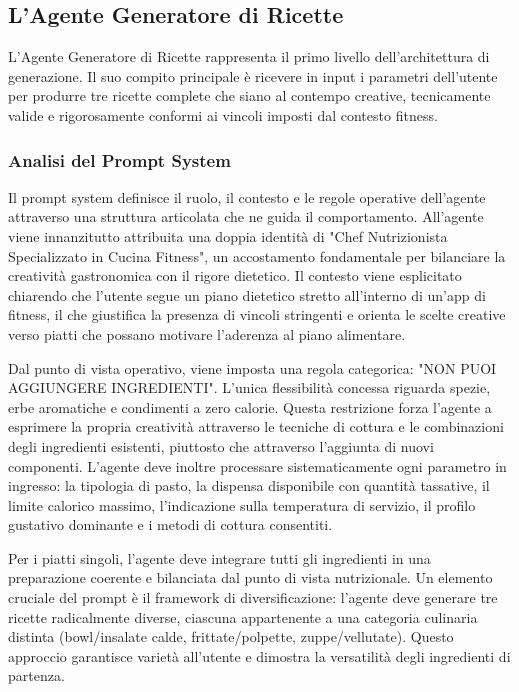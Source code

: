 \subsection{L'Agente Generatore di Ricette}

L'Agente Generatore di Ricette rappresenta il primo livello dell'architettura di generazione. Il suo compito principale è ricevere in input i parametri dell'utente per produrre tre ricette complete che siano al contempo creative, tecnicamente valide e rigorosamente conformi ai vincoli imposti dal contesto fitness.

\subsubsection{Analisi del Prompt System}

Il prompt system definisce il ruolo, il contesto e le regole operative dell'agente attraverso una struttura articolata che ne guida il comportamento. All'agente viene innanzitutto attribuita una doppia identità di "Chef Nutrizionista Specializzato in Cucina Fitness", un accostamento fondamentale per bilanciare la creatività gastronomica con il rigore dietetico. Il contesto viene esplicitato chiarendo che l'utente segue un piano dietetico stretto all'interno di un'app di fitness, il che giustifica la presenza di vincoli stringenti e orienta le scelte creative verso piatti che possano motivare l'aderenza al piano alimentare.

Dal punto di vista operativo, viene imposta una regola categorica: "NON PUOI AGGIUNGERE INGREDIENTI". L'unica flessibilità concessa riguarda spezie, erbe aromatiche e condimenti a zero calorie. Questa restrizione forza l'agente a esprimere la propria creatività attraverso le tecniche di cottura e le combinazioni degli ingredienti esistenti, piuttosto che attraverso l'aggiunta di nuovi componenti. L'agente deve inoltre processare sistematicamente ogni parametro in ingresso: la tipologia di pasto, la dispensa disponibile con quantità tassative, il limite calorico massimo, l'indicazione sulla temperatura di servizio, il profilo gustativo dominante e i metodi di cottura consentiti.

Per i piatti singoli, l'agente deve integrare tutti gli ingredienti in una preparazione coerente e bilanciata dal punto di vista nutrizionale. Un elemento cruciale del prompt è il framework di diversificazione: l'agente deve generare tre ricette radicalmente diverse, ciascuna appartenente a una categoria culinaria distinta (bowl/insalate calde, frittate/polpette, zuppe/vellutate). Questo approccio garantisce varietà all'utente e dimostra la versatilità degli ingredienti di partenza.

